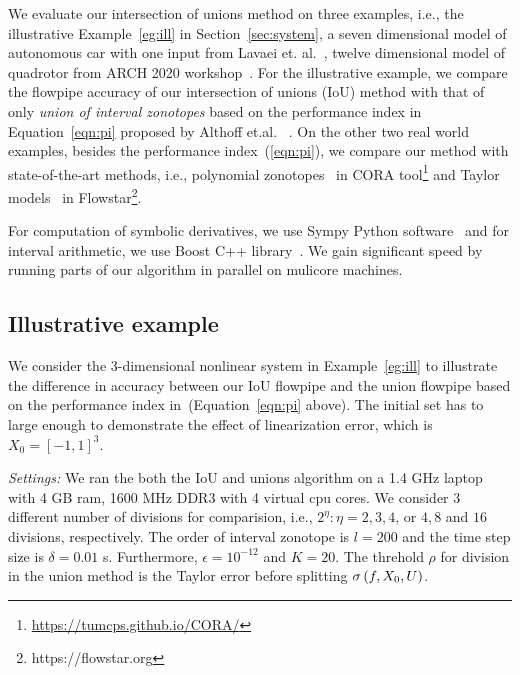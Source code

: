 We evaluate our intersection of unions method on three examples, i.e.,
the illustrative Example~\ref{eg:ill} in Section~\ref{sec:system}, a
seven dimensional model of autonomous car with one input from Lavaei
et. al.~\cite{lavaei2020formal}, twelve dimensional model of quadrotor
from ARCH 2020 workshop~\cite{geretti2020arch}.  For the illustrative
example, we compare the flowpipe accuracy of our intersection of
unions (IoU) method with that of only
\emph{union of interval zonotopes} based on the performance index in
Equation~\ref{eqn:pi} proposed by Althoff
et.al.~\cite{althoff2008reachability} .  On the other two real world
examples, besides the performance index~(\ref{eqn:pi}), we compare our
method with state-of-the-art methods, i.e., polynomial
zonotopes~\cite{althoff2013reachability} in CORA
tool\footnote{\url{https://tumcps.github.io/CORA/}} and Taylor
models~\cite{chen2012taylor} in
Flowstar\footnote{https://flowstar.org}.

For computation of symbolic derivatives, we use Sympy Python
software~\cite{10.7717/peerj-cs.103} and for interval arithmetic, we
use Boost C++ library~\cite{bronnimann2006design}.  We gain
significant speed by running parts of our algorithm in
parallel on mulicore machines.

\subsection{Illustrative example}
We consider the 3-dimensional nonlinear system in Example~\ref{eg:ill}
to illustrate the difference in accuracy between our IoU flowpipe and
the union flowpipe based on the performance index
in~\cite{althoff2008reachability}(Equation~\ref{eqn:pi} above).  The
initial set has to large enough to demonstrate the effect of
linearization error, which is $X_0 = [-1,1]^3$.

\emph{Settings:}  We ran the both the IoU and unions algorithm on a 1.4 GHz
laptop with 4 GB ram, 1600 MHz DDR3 with 4 virtual cpu cores.  We
consider 3 different number of divisions for comparision, i.e.,
$2^\eta:\eta = 2, 3,4$, or $4, 8$ and $16$ divisions,
respectively. The order of interval zonotope is $l = 200$ and the time
step size is $\delta = 0.01$ s.  Furthermore, $\epsilon = 10^{-12}$
and $K = 20$.  The threhold $\rho$ for division in the union method is
the Taylor error before splitting $\sigma\left(f,X_0,U\right)$.

